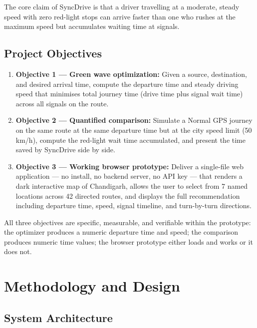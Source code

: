 \documentclass[12pt,a4paper]{report}
\begin{document}
The core claim of SyncDrive is that a driver travelling at a moderate, steady
speed with zero red-light stops can arrive faster than one who rushes at the
maximum speed but accumulates waiting time at signals.

\section{Project Objectives}

\begin{enumerate}
  \item \textbf{Objective 1 --- Green wave optimization:} Given a source,
    destination, and desired arrival time, compute the departure time and
    steady driving speed that minimises total journey time (drive time plus
    signal wait time) across all signals on the route.

  \item \textbf{Objective 2 --- Quantified comparison:} Simulate a Normal GPS
    journey on the same route at the same departure time but at the city speed
    limit (50 km/h), compute the red-light wait time accumulated, and present
    the time saved by SyncDrive side by side.

  \item \textbf{Objective 3 --- Working browser prototype:} Deliver a
    single-file web application --- no install, no backend server, no API key
    --- that renders a dark interactive map of Chandigarh, allows the user to
    select from 7 named locations across 42 directed routes, and displays the
    full recommendation including departure time, speed, signal timeline, and
    turn-by-turn directions.
\end{enumerate}

All three objectives are specific, measurable, and verifiable within the
prototype: the optimizer produces a numeric departure time and speed; the
comparison produces numeric time values; the browser prototype either loads and
works or it does not.

\chapter{Methodology and Design}

\section{System Architecture}
\end{document}
